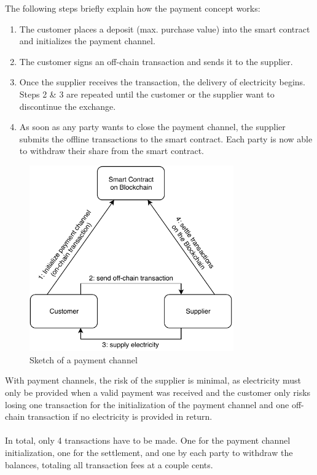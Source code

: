 The following steps briefly explain how the payment concept works:
\\
\begin{enumerate}
    \item The customer places a deposit (max. purchase value) into the smart contract and initializes the payment channel.
    \item The customer signs an off-chain transaction and sends it to the supplier.
    \item Once the supplier receives the transaction, the delivery of electricity begins.
    Steps 2 \& 3 are repeated until the customer or the supplier want to discontinue the exchange.
    \item As soon as any party wants to close the payment channel, the supplier submits the offline transactions to the smart contract.
    Each party is now able to withdraw their share from the smart contract.
\end{enumerate}
\begin{figure}[H]
  \begin{center}
    \includegraphics[height=8cm]{img/payment_channel.pdf}
    \caption{Sketch of a payment channel}
    \label{fig:paymentchannel}
  \end{center}
\end{figure}
With payment channels, the risk of the supplier is minimal, as electricity must only be provided when a valid payment was received and the customer only risks losing one transaction for the initialization of the payment channel and one off-chain transaction if no electricity is provided in return.
\\\\
In total, only 4 transactions have to be made.
One for the payment channel initialization, one for the settlement, and one by each party to withdraw the balances, totaling all transaction fees at a couple cents.
\newpage
